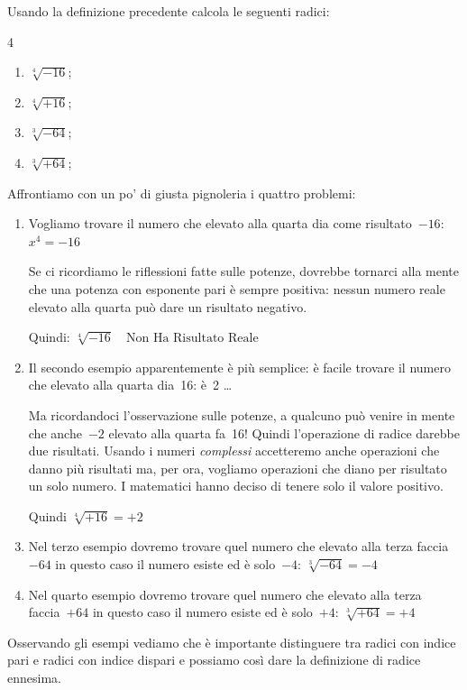 \begin{esempio}{}{}
Usando la definizione precedente calcola le seguenti radici:
\begin{htmulticols}{4}
\begin{enumerate}
  \item \(\sqrt[4]{-16}\);
  \item \(\sqrt[4]{+16}\);
  \item \(\sqrt[3]{-64}\);
  \item \(\sqrt[3]{+64}\);
\end{enumerate}
\end{htmulticols}
Affrontiamo con un po' di giusta pignoleria i quattro problemi:
\begin{enumerate}
\item Vogliamo trovare il numero che elevato alla 
quarta dia come risultato~\(-16\):\quad \(x^4=-16\)

Se ci ricordiamo le riflessioni fatte sulle potenze, dovrebbe tornarci alla 
mente che una potenza con esponente pari è sempre positiva: nessun numero 
reale elevato alla quarta può dare un risultato negativo.

Quindi: \(\sqrt[4]{-16} \quad \text{Non Ha Risultato Reale}\)  

\item Il secondo esempio apparentemente è più semplice: è facile trovare 
il numero che elevato alla quarta dia~16: è~2 \dots

Ma ricordandoci l'osservazione sulle potenze, a qualcuno può venire in 
mente che anche~\(-2\) elevato alla quarta fa~16! 
Quindi l'operazione di radice darebbe due risultati. 
Usando i numeri \emph{complessi} accetteremo anche operazioni che danno 
più risultati ma, per ora, vogliamo operazioni che diano per risultato 
un solo numero. 
I matematici hanno deciso di tenere solo il valore positivo.

Quindi \(\sqrt[4]{+16} = +2\)
\item Nel terzo esempio dovremo trovare quel numero che elevato alla terza 
faccia~\(-64\) in questo caso il numero esiste ed è solo~\(-4\):
\(\sqrt[3]{-64} = -4\)
\item Nel quarto esempio dovremo trovare quel numero che elevato alla 
terza faccia~\(+64\) in questo caso il numero esiste ed è solo~\(+4\):
\(\sqrt[3]{+64} = +4\)
\end{enumerate}
\end{esempio}

Osservando gli esempi vediamo che è importante distinguere tra radici con 
indice pari e radici con indice dispari e possiamo così dare la 
definizione di radice ennesima.

